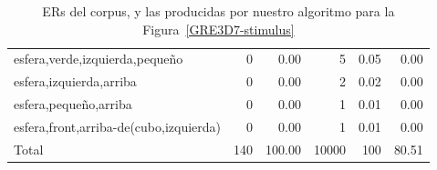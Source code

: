 \begin{table}
\begin{small}
\begin{center}
\begin{tabular}{|l|r|r|r|r|r|}
esfera,verde,izquierda,peque\~no                         &  0 &  0.00 &    5 &  0.05 &  0.00\\
esfera,izquierda,arriba                                 &  0 &  0.00 &    2 &  0.02 &  0.00\\
esfera,peque\~no,arriba                                &  0 &  0.00 &    1 &  0.01 &  0.00\\
esfera,front,arriba-de(cubo,izquierda)                  &  0 &  0.00 &    1 &  0.01 &  0.00\\

\hline
Total & 140 & 100.00 & 10000 & 100 & 80.51 \\
\hline
\end{tabular}
\caption{ERs del corpus, y las producidas por nuestro algoritmo para la Figura~\ref{GRE3D7-stimulus}\label{results-algo-fig3}}
\vspace*{-.5cm}
\end{center}
\end{small}
\end{table}







